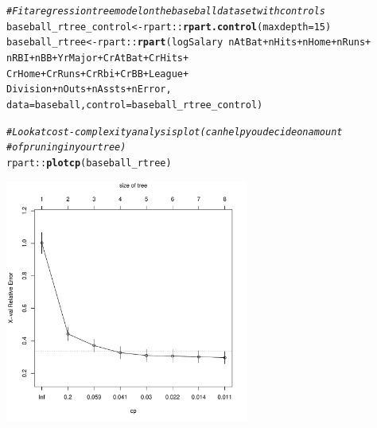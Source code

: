\documentclass{article}\usepackage[]{graphicx}\usepackage[]{color}
\makeatletter
\newcommand{\hlnum}[1]{\textcolor[rgb]{0.686,0.059,0.569}{#1}}%
\newcommand{\hlcom}[1]{\textcolor[rgb]{0.678,0.584,0.686}{\textit{#1}}}%
\newcommand{\hlopt}[1]{\textcolor[rgb]{0,0,0}{#1}}%
\newcommand{\hlstd}[1]{\textcolor[rgb]{0.345,0.345,0.345}{#1}}%
\newcommand{\hlkwb}[1]{\textcolor[rgb]{0.69,0.353,0.396}{#1}}%
\newcommand{\hlkwc}[1]{\textcolor[rgb]{0.333,0.667,0.333}{#1}}%
\newcommand{\hlkwd}[1]{\textcolor[rgb]{0.737,0.353,0.396}{\textbf{#1}}}%
\newenvironment{kframe}{%
 \def\at@end@of@kframe{}%
 \ifinner\ifhmode%
  \def\at@end@of@kframe{\end{minipage}}%
  \begin{minipage}{\columnwidth}%
 \fi\fi%
 \def\FrameCommand##1{\hskip\@totalleftmargin \hskip-\fboxsep
 \colorbox{shadecolor}{##1}\hskip-\fboxsep
     \hskip-\linewidth \hskip-\@totalleftmargin \hskip\columnwidth}%
 \MakeFramed {\advance\hsize-\width
   \@totalleftmargin\z@ \linewidth\hsize
   \@setminipage}}%
 {\par\unskip\endMakeFramed%
 \at@end@of@kframe}
\newenvironment{knitrout}{}{} %
\makeatother
\begin{document}
\begin{knitrout}
\color{fgcolor}\begin{kframe}
\begin{alltt}
\hlcom{# Fit a regression tree model on the baseball dataset with controls}
\hlstd{baseball_rtree_control} \hlkwb{<-} \hlstd{rpart}\hlopt{::}\hlkwd{rpart.control}\hlstd{(}\hlkwc{maxdepth} \hlstd{=} \hlnum{15}\hlstd{)}
\hlstd{baseball_rtree} \hlkwb{<-} \hlstd{rpart}\hlopt{::}\hlkwd{rpart}\hlstd{(logSalary} \hlopt{~} \hlstd{nAtBat} \hlopt{+} \hlstd{nHits} \hlopt{+} \hlstd{nHome} \hlopt{+} \hlstd{nRuns} \hlopt{+}
                                 \hlstd{nRBI} \hlopt{+} \hlstd{nBB} \hlopt{+} \hlstd{YrMajor} \hlopt{+} \hlstd{CrAtBat} \hlopt{+} \hlstd{CrHits} \hlopt{+}
                                 \hlstd{CrHome} \hlopt{+} \hlstd{CrRuns} \hlopt{+} \hlstd{CrRbi} \hlopt{+} \hlstd{CrBB} \hlopt{+} \hlstd{League} \hlopt{+}
                                 \hlstd{Division} \hlopt{+} \hlstd{nOuts} \hlopt{+} \hlstd{nAssts} \hlopt{+} \hlstd{nError,}
                               \hlkwc{data} \hlstd{= baseball,} \hlkwc{control} \hlstd{= baseball_rtree_control)}

\hlcom{# Look at cost-complexity analysis plot (can help you decide on amount}
\hlcom{# of pruning in your tree)}
\hlstd{rpart}\hlopt{::}\hlkwd{plotcp}\hlstd{(baseball_rtree)}
\end{alltt}
\end{kframe}

{\centering \includegraphics[width=0.6\textwidth]{figure/unnamed-chunk-3-1} 

}



\end{knitrout}
\end{document}
